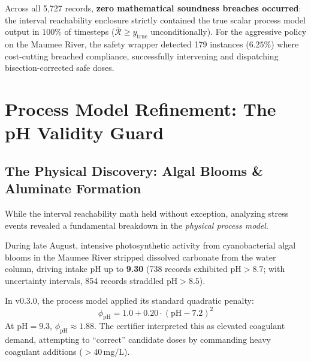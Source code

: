\documentclass[10pt,twocolumn,letterpaper]{article}
\theoremstyle{definition}
\newcommand{\phipH}{\phi_{\text{pH}}}
\newcommand{\Rbar}{\overline{\mathcal{R}}}
\begin{document}
Across all 5,727 records, \textbf{zero mathematical soundness breaches occurred}: the interval reachability enclosure strictly contained the true scalar process model output in $100\%$ of timesteps ($\Rbar \ge y_{\text{true}}$ unconditionally). For the aggressive policy on the Maumee River, the safety wrapper detected 179 instances ($6.25\%$) where cost-cutting breached compliance, successfully intervening and dispatching bisection-corrected safe doses.

\section{Process Model Refinement: The pH Validity Guard}

\subsection{The Physical Discovery: Algal Blooms \& Aluminate Formation}
While the interval reachability math held without exception, analyzing stress events revealed a fundamental breakdown in the \textit{physical process model}.

During late August, intensive photosynthetic activity from cyanobacterial algal blooms in the Maumee River stripped dissolved carbonate from the water column, driving intake pH up to \textbf{9.30} (738 records exhibited $\text{pH} > 8.7$; with uncertainty intervals, 854 records straddled $\text{pH} > 8.5$).

In v0.3.0, the process model applied its standard quadratic penalty:
\begin{equation}
\phipH = 1.0 + 0.20 \cdot (\text{pH} - 7.2)^2
\end{equation}
At $\text{pH} = 9.3$, $\phipH \approx 1.88$. The certifier interpreted this as elevated coagulant demand, attempting to ``correct'' candidate doses by commanding heavy coagulant additions ($>40\,\text{mg/L}$).
\end{document}
